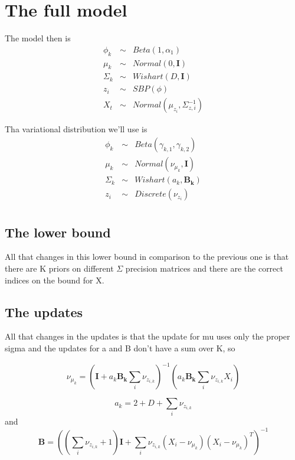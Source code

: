 \documentclass{article}
\newcommand{\m}[1]{\nu_{#1}}
\begin{document}
\section{The full model}
\label{sec:tied-model}

 The model then is
\begin{eqnarray*}
  \phi_k   &\sim& Beta(1, \alpha_1) \\
  \mu_k   &\sim& Normal(0,  \mathbf{I}) \\
  \Sigma_k &\sim& Wishart(D, \mathbf{I}) \\
  z_{i}     &\sim& SBP(\phi) \\
  X_t &\sim& Normal(\mu_{z_i},  \Sigma_{z,i}^{-1})
\end{eqnarray*}

Tha variational distribution we'll use is
\begin{eqnarray*}
  \phi_k   &\sim& Beta(\gamma_{k,1}, \gamma_{k,2}) \\
  \mu_k   &\sim& Normal(\m{\mu_k},  \mathbf{I}) \\
  \Sigma_k &\sim& Wishart(a_k, \mathbf{B_k}) \\
  z_{i}     &\sim& Discrete(\m{z_i}) \\
\end{eqnarray*}


\subsection{The lower bound}
\label{sec:lower-bound-2}

All that changes in this lower bound in comparison to the previous one
is that there are K priors on different $\Sigma$ precision matrices
and there are the correct indices on the bound for X.

\subsection{The updates}
\label{sec:updates-3}

All that changes in the updates is that the update for mu uses only
the proper sigma and the updates for a and B don't have a sum over K, so 

\begin{equation}
  \m{\mu_k} = \left(\mathbf{I}+ a_k\mathbf{B_k}\sum_i \m{z_{i,k}}\right)^{-1}
    \left(a_k\mathbf{B_k}\sum_i \m{z_{i,k}} X_i\right)
\end{equation}

\[
a_k = 2 + D + \sum_i \m{z_{i,k}}
\]
and
\[
\mathbf{B} = \left(\left(\sum_i\m{z_{i,k}}+1\right)\mathbf{I} + \sum_i  \m{z_{i,k}}(X_i-\m{\mu_k})(X_i-\m{\mu_k})^T\right)^{-1}
\]




\end{document}
